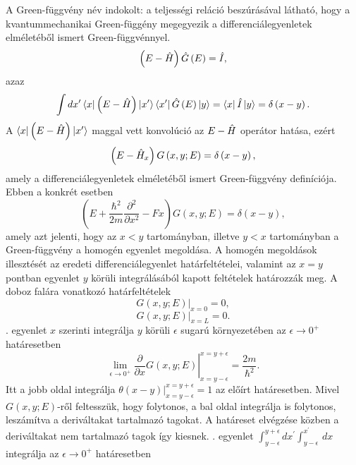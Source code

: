 \label{egzakt}
A Green-függvény név indokolt: a teljességi reláció beszúrásával látható, hogy a kvantummechanikai Green-függény megegyezik a differenciálegyenletek elméletéből ismert Green-függvénnyel.
\begin{equation}
    \left(E-\hat{H}\right)\hat{G}\left( E \right) = \hat{I},
\end{equation}
azaz
\begin{equation}
    \int dx^\prime \Bra{x}\left(E-\hat{H}\right) \Ket{x^\prime}\Bra{x^\prime} \hat{G}\left( E \right)\Ket{y} = \Bra{x}\hat{I}\Ket{y} = \delta \left(x - y\right).
\end{equation} 
A $\Bra{x}\left(E-\hat{H}\right) \Ket{x^\prime}$ maggal vett konvolúció az $E-\hat{H}$ operátor hatása, ezért
\begin{equation}
    \left(E-\hat{H}_x\right) G\left(x, y; E\right) = \delta\left(x - y\right),
\end{equation}
amely a differenciálegyenletek elméletéből ismert Green-függvény definíciója. Ebben a konkrét esetben
\begin{equation}
    \left(E +\frac{\hbar^2}{2m}\frac{\partial^2}{\partial x^2} - Fx \right) G\left(x, y; E\right) = \delta\left(x - y\right),
	\label{green:deltaeq}
\end{equation}
amely azt jelenti, hogy az $x < y$ tartományban, illetve $y < x$ tartományban a Green-függvény a homogén egyenlet megoldása. A homogén megoldások illesztését az eredeti differenciálegyenlet határfeltételei, valamint az $x = y$ pontban  egyenlet $y$ körüli integrálásából kapott feltételek határozzák meg. A doboz falára vonatkozó határfeltételek
\begin{equation}
	\left. G\left(x,y;E\right)\right\rvert_{x = 0} = 0,
	\label{green:01}
\end{equation}
\begin{equation}
	\left. G\left(x,y;E\right)\right\rvert_{x = L} = 0.
	\label{green:02}
\end{equation}
. egyenlet $x$ szerinti integrálja $y$ körüli $\epsilon$ sugarú környezetében az $\epsilon \to 0^+$ határesetben
\begin{equation}
	\lim_{\epsilon \to 0^+}\left.\frac{\partial}{\partial x}G\left(x,y;E \right)\right\rvert_{x = y - \epsilon}^{x = y + \epsilon} = \frac{2m}{\hbar^2}.
	\label{egzakt:jump}
\end{equation}
Itt a jobb oldal integrálja $\left. \theta\left(x - y\right) \right\rvert_{x = y - \epsilon}^{x = y + \epsilon} = 1$ az előírt határesetben. Mivel $G(x,y;E)$-ről feltesszük, hogy folytonos, a bal oldal integrálja is folytonos, leszámítva a deriváltakat tartalmazó tagokat. A határeset elvégzése közben a deriváltakat nem tartalmazó tagok így kiesnek. . egyenlet $\int_{y-\epsilon}^{y+\epsilon}dx^\prime \int_{y-\epsilon}^{x^\prime} \,dx$ integrálja az $\epsilon \to 0^+$ határesetben
